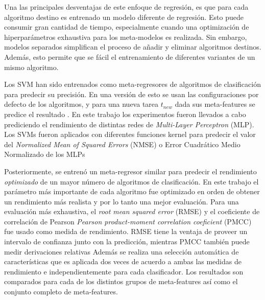 Una las principales desventajas de este enfoque de regresión, es que para cada algoritmo destino es entrenado un modelo diferente de regresión. Esto puede consumir gran cantidad de tiempo, especialmente cuando una optimización de hiperparámetros exhaustiva para los meta-modelos es realizada. Sin embargo, modelos separados simplifican el proceso de añadir y eliminar algoritmos destinos. Además, esto permite que se fácil el entrenamiento de diferentes variantes de un mismo algoritmo. 

Los SVM han sido entrenados como meta-regresores de algoritmos de clasificación para predecir su precisión. En una versión de esto se usan las configuraciones por defecto de los algoritmos, y para una nueva tarea $t_{new}$ dada sus meta-features se predice el resultado \cite{guerra2008predicting}. En este trabajo los experimentos fueron llevados a cabo prediciendo el rendimiento de distintas redes de \textit{Multi-Layer Perceptron} (MLP). Los SVMs fueron aplicados con diferentes funciones kernel para predecir el valor del \textit{Normalized Mean of Squared Errors} (NMSE) o Error Cuadrático Medio Normalizado de los MLPs

Posteriormente, se entrenó un meta-regresor similar \cite{reif2012automatic} para predecir el rendimiento \textit{optimizado} de un mayor número de algoritmos de clasificación. En este trabajo el parámetro más importante de cada algoritmo fue optimizado en orden de obtener un rendimiento más realista y por lo tanto una mejor evaluación. Para una evaluación más exhaustiva, el \textit{root mean squared error} (RMSE) y el coeficiente de correlación de Pearson \textit{Pearson product-moment correlation coeficient} (PMCC) fue usado como medida de rendimiento. RMSE tiene la ventaja de proveer un intervalo de confianza junto con la predicción, mientras PMCC también puede medir derivaciones relativas Además se realiza una selección automática de características que es aplicada dos veces de acuerdo a ambas las medidas de rendimiento e independientemente para cada clasificador. Los resultados son comparados para cada de los distintos grupos de meta-features así como el conjunto completo de meta-features.

%
%
%
%

